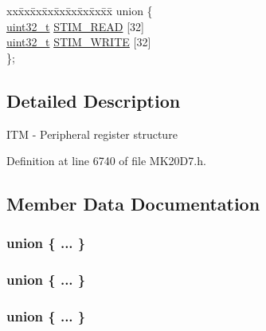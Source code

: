 \begin{DoxyCompactItemize}
\begin{tabbing}
\end{tabbing}\item 
\begin{tabbing}
xx\=xx\=xx\=xx\=xx\=xx\=xx\=xx\=xx\=\kill
union \{\\
\>\hyperlink{_p_e___types_8h_a33594304e786b158f3fb30289278f5af}{uint32\_t} \hyperlink{struct_i_t_m___mem_map_afb3f200b95047ddd2dc4b045887ebfa3}{STIM\_READ} \mbox{[}32\mbox{]}\\
\>\hyperlink{_p_e___types_8h_a33594304e786b158f3fb30289278f5af}{uint32\_t} \hyperlink{struct_i_t_m___mem_map_a0ba1ca981edcde8bf08accc593fa1f52}{STIM\_WRITE} \mbox{[}32\mbox{]}\\
\}; \\

\end{tabbing}\end{DoxyCompactItemize}


\subsection{Detailed Description}
I\+TM -\/ Peripheral register structure 

Definition at line 6740 of file M\+K20\+D7.\+h.



\subsection{Member Data Documentation}
\subsubsection[{\texorpdfstring{"@120}{@120}}]{\setlength{\rightskip}{0pt plus 5cm}union \{ ... \} }\hypertarget{struct_i_t_m___mem_map_a36fa1a7ee425c43d9ec1574c4fedfba9}{}\label{struct_i_t_m___mem_map_a36fa1a7ee425c43d9ec1574c4fedfba9}
\subsubsection[{\texorpdfstring{"@30}{@30}}]{\setlength{\rightskip}{0pt plus 5cm}union \{ ... \} }\hypertarget{struct_i_t_m___mem_map_a810b5f14f21c0cf2c0177610efd25ad3}{}\label{struct_i_t_m___mem_map_a810b5f14f21c0cf2c0177610efd25ad3}
\subsubsection[{\texorpdfstring{"@81}{@81}}]{\setlength{\rightskip}{0pt plus 5cm}union \{ ... \} }\hypertarget{struct_i_t_m___mem_map_a8e321dd40a6526db54d2825a6992faa9}{}\label{struct_i_t_m___mem_map_a8e321dd40a6526db54d2825a6992faa9}
